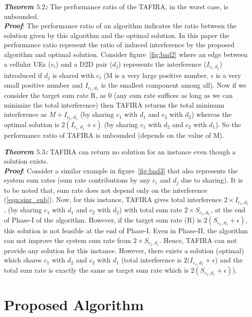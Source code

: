 \documentclass{ieeeaccess}
\begin{document}
\smallskip

 \textbf{\textit{Theorem $5.2$:}} The performance ratio of the TAFIRA, in the worst case, is unbounded. \\
 \textbf{\textit{Proof}}:  The performance ratio of an algorithm indicates the ratio between the solution given by this algorithm and the optimal solution. In this paper the performance ratio represent the ratio of induced interference by the proposed algorithm and optimal solution. Consider figure~\ref{fig:bad2}  where an edge between a cellular UEs ($c_i$) and a D2D pair ($d_j$) represents the interference ($I_{c_i,d_j}$) introduced if $d_j$ is shared with $c_i$  (M is a very large positive number, $\epsilon$ is a very small positive number and $I_{c_1,d_1}$ is the smallest component among all). Now if we consider the target sum rate R, as 0 (any sum rate suffices as long as we can minimize the total interference) then TAFIRA returns the total minimum interference as $M+I_{c_1,d_1}$ (by sharing $c_1$ with $d_1$ and $c_2$ with $d_2$) whereas the optimal solution is $2(I_{c_1,d_1}+\epsilon)$ (by sharing $c_1$ with $d_2$ and $c_2$ with $d_1$). So the performance ratio of TAFIRA is unbounded (depends on the value of M).
 
\smallskip

 \textbf{\textit{Theorem $5.3$:}} TAFIRA can return no solution for an instance even though a solution exists.\\
 \textbf{\textit{Proof}}: Consider a similar example in figure~\ref{fig:bad3} that also represents the system sum rates (sum rate contributions by any $c_i$ and $d_j$ due to sharing). It is to be noted that, sum rate does not depend only on the interference (\ref{eqn:sinr_enb}). Now, for this instance, TAFIRA gives total interference $2 \times I_{c_1, d_1}$, (by sharing $c_1$ with $d_1$ and $c_2$ with $d_2$) with total sum rate $2 \times S_{c_1, d_1}$, at the end of Phase-I of the algorithm. However, if the target sum rate (R) is $2(S_{c_1, d_1}+\epsilon)$, this solution is not feasible at the end of Phase-I.  Even in Phase-II, the algorithm can not improve the system sum rate from $2 \times S_{c_1, d_1}$.  Hence, TAFIRA can not provide any solution for this instance. However, there exists a solution (optimal) which shares $c_1$ with $d_2$ and $c_2$ with $d_1$ (total interference is $2(I_{c_1, d_1}+\epsilon$) and the total sum rate is exactly the same as target sum rate which is $2(S_{c_1, d_1}+\epsilon)$).


\section{Proposed Algorithm}\label{section:algorithm}
\smallskip
 
\end{document}

